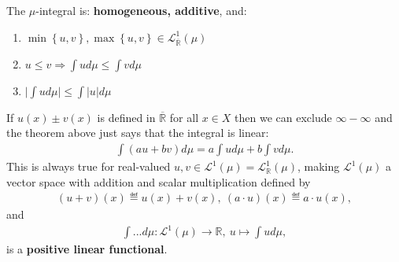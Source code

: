 \begin{theorem} The \(\mu\)-integral is: \textbf{homogeneous, additive}, and:
    \begin{enumerate}[label=(\roman*)]
        \item \(\min\left\{u,v\right\}, \max\left\{u,v\right\} \in \mathcal{L}^{1}_{\overline{\mathbb{R}}}(\mu)\) 
        \item \(u\leq v \Rightarrow \int ud\mu \leq \int vd\mu\) 
        \item \(\Big\vert \int ud\mu \Big\vert \leq \int \vert u\vert d\mu\) 
    \end{enumerate}
\end{theorem}
\begin{remark}
    If \(u(x) \pm v(x)\) is defined in \(\overline{\mathbb{R}}\) for all \(x\in X\) then we can exclude \(\infty - \infty\) and the theorem above just says that 
    the integral is linear:
    \begin{align}
        \int (au + bv)d\mu = a\int ud\mu + b\int vd\mu.
    \end{align}
    This is always true for real-valued \(u,v\in\mathcal{L}^{1}(\mu) = \mathcal{L}^{1}_{\mathbb{R}}(\mu)\), making \(\mathcal{L}^{1}(\mu)\) a vector space with 
    addition and scalar multiplication defined by
    \begin{align}
        (u + v)(x) \eqdef u(x) + v(x), \ (a\cdot u)(x) \eqdef a\cdot u(x),
    \end{align}
    and
    \begin{align}
        \int ... d\mu: \mathcal{L}^{1}(\mu) \rightarrow \mathbb{R}, \ u \mapsto \int ud\mu,
    \end{align}
    is a \textbf{positive linear functional}.
\end{remark}

